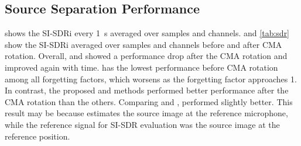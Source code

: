 \documentclass[sip,biber]{now-journal}
\begin{document}
\subsection{Source Separation Performance}

 shows the SI-SDRi every \SI{1}{\second} averaged over samples and channels.
 and \cref{tab:sdr} show the SI-SDRi averaged over samples and channels before and after CMA rotation.
Overall, \NaiveIVA{} and \ResetIVA{} showed a performance drop after the CMA rotation and improved again with time.
\ResetIVA{} has the lowest performance before CMA rotation among all forgetting factors, which worsens as the forgetting factor approaches 1.
In contrast, the proposed \SFIIVAm{} and \SFIIVAo{} methods performed better performance after the CMA rotation than the others.
Comparing \SFIIVAm{} and \SFIIVAo{}, \SFIIVAm{} performed slightly better.
This result may be because \SFIIVAo{} estimates the source image at the reference microphone, while the reference signal for SI-SDR evaluation was the source image at the reference position.
\end{document}
